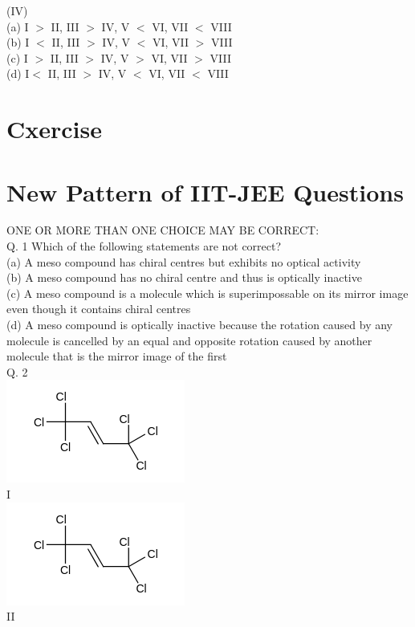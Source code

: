 \documentclass[10pt]{article}
\begin{document}
(IV)\\
(a) I $>$ II, III $>$ IV, V $<$ VI, VII $<$ VIII\\
(b) I $<$ II, III $>$ IV, V $<$ VI, VII $>$ VIII\\
(c) I $>$ II, III $>$ IV, V $>$ VI, VII $>$ VIII\\
(d) $\mathrm{I}<$ II, III $>$ IV, V $<$ VI, VII $<$ VIII

\section*{Cxercise}
\section*{New Pattern of IIT-JEE Questions}
ONE OR MORE THAN ONE CHOICE MAY BE CORRECT:\\
Q. 1 Which of the following statements are not correct?\\
(a) A meso compound has chiral centres but exhibits no optical activity\\
(b) A meso compound has no chiral centre and thus is optically inactive\\
(c) A meso compound is a molecule which is superimpossable on its mirror image even though it contains chiral centres\\
(d) A meso compound is optically inactive because the rotation caused by any molecule is cancelled by an equal and opposite rotation caused by another molecule that is the mirror image of the first\\
Q. 2\\
\includegraphics{smile-8bf3a2e0c5ce36e9c6734a66f3cf7b962dfa0d39}\\
I\\
\includegraphics{smile-f40776e0ba1cb81ec4e9220fd7e95d7e6fd670db}\\
II
\end{document}
